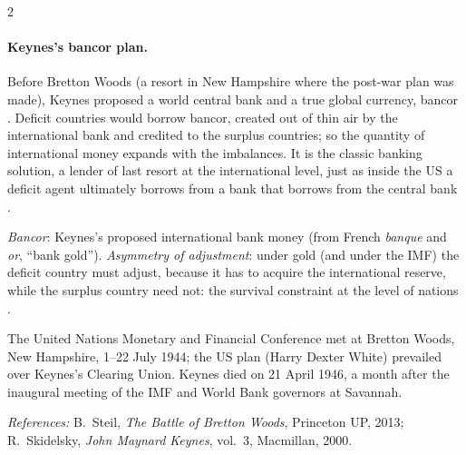 \begin{paracol}{2}
\paragraph{Keynes's bancor plan.} Before Bretton Woods (a resort in New Hampshire where the post-war plan was made), Keynes proposed a world central bank and a true
global currency, bancor . Deficit countries would borrow bancor, created out of thin air by the
international bank and credited to the surplus countries; so the quantity of international money expands with the imbalances. It is the classic banking
solution, a lender of last resort at the international level, just as inside the US a deficit agent ultimately borrows from a bank that borrows from the central
bank .

\begin{definition}
\emph{Bancor}: Keynes's proposed international bank money (from French \emph{banque} and \emph{or}, ``bank gold''). \emph{Asymmetry of adjustment}: under gold
(and under the IMF) the deficit country must adjust, because it has to acquire the international reserve, while the surplus country need not: the survival
constraint at the level of nations .
\end{definition}

\begin{nfigure}
\begin{taccts}
\quad
{}\quad
{}
\end{taccts}
\caption{The bancor plan: imbalances expand the international bank's balance sheet .}\label{fig:intl-bancor}
\end{nfigure}

\begin{history}
The United Nations Monetary and Financial Conference met at Bretton Woods, New Hampshire, 1--22 July 1944; the US plan (Harry Dexter White) prevailed over
Keynes's Clearing Union. Keynes died on 21 April 1946, a month after the inaugural meeting of the IMF and World Bank governors at Savannah.\par
\emph{References:} B.~Steil, \emph{The Battle of Bretton Woods}, Princeton UP, 2013; R.~Skidelsky, \emph{John Maynard Keynes}, vol.~3, Macmillan, 2000.
\end{history}


\end{paracol}
